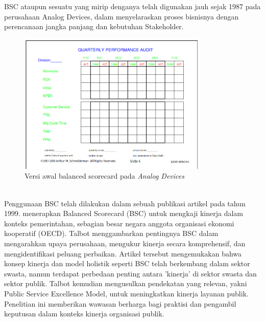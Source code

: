 \documentclass{article}
\begin{document}
BSC ataupun sesuatu yang mirip denganya  telah digunakan jauh sejak 1987 \cite{BSCAnalogBibEntry2023Jun} pada perusahaan Analog Devices, dalam menyelaraskan proses bisnisnya dengan perencanaan jangka panjang dan kebutuhan Stakeholder. 
\begin{figure}[htbp]
    \centering
    \includegraphics[width=0.8\textwidth]{balanced-scorecard-1987}
    \caption{Versi awal balanced scorecard pada \emph{Analog Devices}}
    \label{fig:my_image}
  \end{figure}\\

Penggunaan BSC telah dilakukan dalam sebuah publikasi artikel pada  tahun 1999. \cite{Talbot1999PublicP} menerapkan  Balanced Scorecard (BSC) untuk mengkaji kinerja dalam konteks pemerintahan, sebagian besar negara anggota organisasi ekonomi kooperatif (OECD). Talbot menggambarkan pentingnya BSC dalam mengarahkan upaya perusahaan, mengukur kinerja secara komprehensif, dan mengidentifikasi peluang perbaikan. Artikel tersebut mengemukakan bahwa konsep kinerja dan model holistik seperti BSC telah berkembang dalam sektor swasta, namun terdapat perbedaan penting antara 'kinerja' di sektor swasta dan sektor publik. Talbot kemudian mengusulkan pendekatan yang relevan, yakni Public Service Excellence Model, untuk meningkatkan kinerja layanan publik. Penelitian ini memberikan wawasan berharga bagi praktisi dan pengambil keputusan dalam konteks kinerja organisasi publik.
\end{document}
